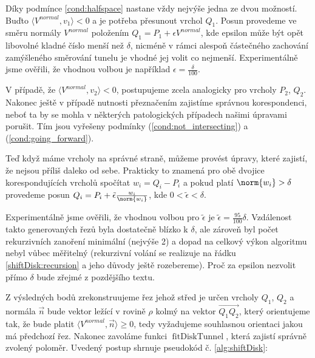 Díky podmínce \ref{cond:halfspace} nastane vždy nejvýše jedna
ze dvou možností. Buďto $ \langle V^{normal}, v_1\rangle < 0 $ a je potřeba
přesunout vrchol $ Q_1 $. Posun provedeme ve směru normály $ V^{normal} $ položením
$ Q_1 = P_1 + \epsilon V^{normal} $, kde epsilon může být opět libovolné
kladné číslo menší než $ \delta $, nicméně v rámci alespoň částečného zachování
zamýšleného směrování tunelu je vhodné jej volit co nejmenší. Experimentálně
jsme ověřili, že vhodnou volbou je například $ \epsilon = \frac{\delta}{100} $.

V případě, že $ \langle V^{normal}, v_2\rangle < 0 $, postupujeme zcela analogicky
pro vrcholy $ P_2 $, $ Q_2 $. Nakonec ještě v případě nutnosti přeznačením
zajistíme správnou korespondenci, neboť ta by se mohla v některých patologických
případech našimi úpravami porušit. Tím jsou vyřešeny podmínky
(\ref{cond:not_intersecting}) a (\ref{cond:going_forward}).

Teď když máme vrcholy na správné straně, můžeme provést úpravy, které zajistí,
že nejsou příliš daleko od sebe. Prakticky to znamená pro obě dvojice
korespondujících vrcholů spočítat $ w_i = Q_i - P_i $ a pokud platí
$ \norm{w_i} > \delta $ provedeme posun
$ Q_i = P_i + \tilde{\epsilon} \frac{w_i}{\norm{w_i}} $, kde
$ 0 < \tilde{\epsilon} < \delta $.

Experimentálně jsme ověřili, že vhodnou volbou pro $ \tilde{\epsilon} $ je
$ \tilde{\epsilon} = \frac{95}{100} \delta$. Vzdálenost takto generovaných řezů
byla dostatečně blízko k $ \delta $, ale zároveň byl počet rekurzivních zanoření
minimální (nejvýše 2) a dopad na celkový výkon algoritmu nebyl vůbec měřitelný
(rekurzivní volání se realizuje na řádku \ref{shiftDisk:recursion} a jeho důvody
ještě rozebereme). Proč za epsilon nezvolit přímo $ \delta $ bude zřejmé z
pozdějšího textu.

Z výsledných bodů zrekonstruujeme řez jehož střed je určen vrcholy
$ Q_1 $, $ Q_2 $ a normála $ \vec{n} $ bude vektor ležící v rovině $ \rho $
kolmý na vektor $ \overrightarrow{Q_1 Q_2} $, který orientujeme tak, že bude platit
$ \langle V^{normal}, \vec{n} \rangle \geq 0 $, tedy vyžadujeme souhlasnou
orientaci jakou má předchozí řez. Nakonec zavoláme funkci
$ \operatorname{fitDiskTunnel} $, která zajistí správně zvolený poloměr.
Uvedený postup shrnuje pseudokód č. \ref{alg:shiftDisk}:


